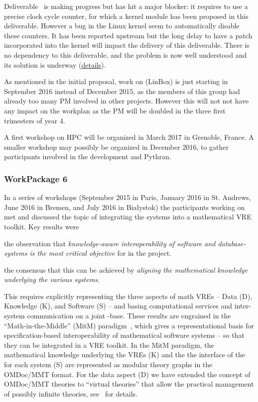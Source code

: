 \documentclass{deliverablereport}
\begin{document}
Deliverable~ is making
progress but has hit a major blocker: it requires to use a precise
clock cycle counter, for which a kernel module has been proposed in
this deliverable. However a bug in the Linux kernel seem to
automatically disable these counters. It has been reported upstream
but the long delay to have a patch incorporated into the kernel will
impact the delivery of this deliverable. There is no dependency to
this deliverable, and the problem is now well understood and its
solution is underway
(\href{https://github.com/OpenDreamKit/OpenDreamKit/issues/118}{details}).

As mentioned in the initial proposal, work on
 (LinBox) is just starting in September 2016 instead
of December 2015, as the members of this group had already too many PM involved in other
projects. However this will not not have any impact on the workplan as the PM will be doubled
in the three first trimesters of year 4.

A first workshop on HPC will be organized in March 2017 in Grenoble,
France. A smaller workshop may possibly be organized in December 2016,
to gather participants involved in the development and Pythran.

\subsubsection{WorkPackage 6}
In a series of workshops (September 2015 in Paris, January 2016 in
St. Andrews, June 2016 in Bremen, and July 2016 in Bia{\l}ystok) the
participants working on  met and discussed the topic
of integrating the \pn systems into a mathematical VRE toolkit.  Key
results were
\begin{compactitem}[\bf R1.]
\item the observation that \emph{knowledge-aware interoperability of
    software and database-systems is the most critical objective} for
   in the \pn project.
\item the consensus that this can be achieved by \emph{aligning the
    mathematical knowledge underlying the various systems}.
\end{compactitem}
This requires explicitly representing the three aspects of math VREs
-- Data (D), Knowledge (K), and Software (S) -- and basing
computational services and inter-system communication on a joint
\DKS-base. These results are engrained in the ``Math-in-the-Middle''
(MitM) paradigm~\cite{DehKohKon:iop16}, which gives a representational
basis for specification-based interoperability of mathematical
software systems -- so that they can be integrated in a VRE
toolkit. In the MitM paradigm, the mathematical knowledge underlying
the VREs (K) and the the interface of the for each system (S) are
represented as modular theory graphs in the OMDoc/MMT format. For the
data aspect (D) we have extended the concept of OMDoc/MMT theories to
``virtual theories'' that allow the practical management of possibly
infinite theories, see~\cite{ODK-D6.2} for details.
\end{document}
